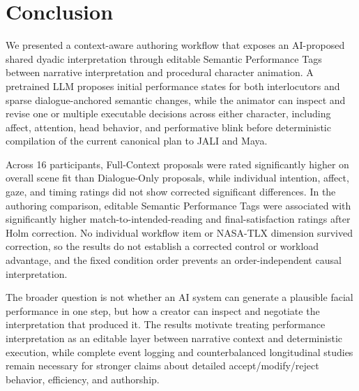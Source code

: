 \section{Conclusion}

We presented a context-aware authoring workflow that exposes an AI-proposed shared dyadic interpretation through editable Semantic Performance Tags between narrative interpretation and procedural character animation. A pretrained LLM proposes initial performance states for both interlocutors and sparse dialogue-anchored semantic changes, while the animator can inspect and revise one or multiple executable decisions across either character, including affect, attention, head behavior, and performative blink before deterministic compilation of the current canonical plan to JALI and Maya.

Across 16 participants, Full-Context proposals were rated significantly higher on overall scene fit than Dialogue-Only proposals, while individual intention, affect, gaze, and timing ratings did not show corrected significant differences. In the authoring comparison, editable Semantic Performance Tags were associated with significantly higher match-to-intended-reading and final-satisfaction ratings after Holm correction. No individual workflow item or NASA-TLX dimension survived correction, so the results do not establish a corrected control or workload advantage, and the fixed condition order prevents an order-independent causal interpretation.

The broader question is not whether an AI system can generate a plausible facial performance in one step, but how a creator can inspect and negotiate the interpretation that produced it. The results motivate treating performance interpretation as an editable layer between narrative context and deterministic execution, while complete event logging and counterbalanced longitudinal studies remain necessary for stronger claims about detailed accept/modify/reject behavior, efficiency, and authorship.

